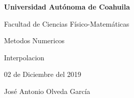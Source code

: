 \documentclass{article}
\begin{document}
\begin{center}
{\Large \textbf{Universidad Autónoma de Coahuila}}
\end{center}

\begin{center}
{\large Facultad de Ciencias Físico-Matemáticas}
\end{center}

\begin{center}
{\large Metodos Numericos}
\end{center}

\begin{center}
{\large Interpolacion}
\end{center}

\begin{center}
{\large 02 de Diciembre del 2019}
\end{center}

\begin{center}
{\large José Antonio Olveda García}
\end{center}

\vspace{5mm}
\end{document}

